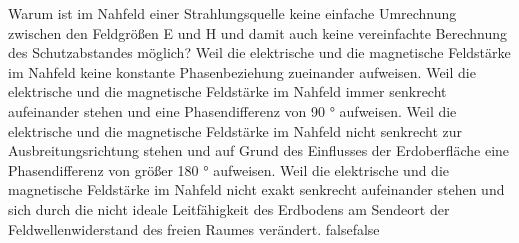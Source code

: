     {Warum ist im Nahfeld einer Strahlungsquelle keine einfache Umrechnung zwischen den Feldgrößen E und H und damit auch keine vereinfachte Berechnung des Schutzabstandes möglich?}
    {Weil die elektrische und die magnetische Feldstärke im Nahfeld keine konstante Phasenbeziehung zueinander aufweisen.}
    {Weil die elektrische und die magnetische Feldstärke im Nahfeld immer senkrecht aufeinander stehen und eine Phasendifferenz von 90 ° aufweisen.}
    {Weil die elektrische und die magnetische Feldstärke im Nahfeld nicht senkrecht zur Ausbreitungsrichtung stehen und auf Grund des Einflusses der Erdoberfläche eine Phasendifferenz von größer 180 ° aufweisen.}
    {Weil die elektrische und die magnetische Feldstärke im Nahfeld nicht exakt senkrecht aufeinander stehen und sich durch die nicht ideale Leitfähigkeit des Erdbodens am Sendeort der Feldwellenwiderstand des freien Raumes verändert.}
    {false}{false}